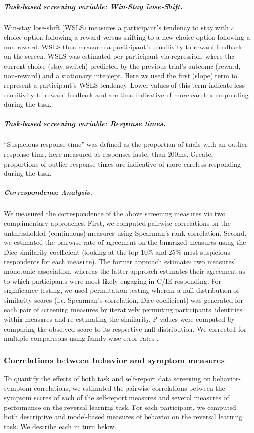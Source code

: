 \documentclass[a4paper,notitlepage,12pt]{article}
\begin{document}
\begin{refsection}[main]
\subparagraph{Task-based screening variable: Win-Stay Lose-Shift.} Win-stay lose-shift (WSLS) measures a participant's tendency to stay with a choice option following a reward versus shifting to a new choice option following a non-reward. WSLS thus measures a participant's sensitivity to reward feedback on the screen. WSLS was estimated per participant via regression, where the current choice (stay, switch) predicted by the previous trial's outcome (reward, non-reward) and a stationary intercept. Here we used the first (slope) term to represent a participant's WSLS tendency. Lower values of this term indicate less sensitivity to reward feedback and are thus indicative of more careless responding during the task.

\subparagraph{Task-based screening variable: Response times.} ``Suspicious response time'' was defined as the proportion of trials with an outlier response time, here measured as responses faster than 200ms. Greater proportions of outlier response times are indicative of more careless responding during the task.

\subparagraph{Correspondence Analysis.} We measured the correspondence of the above screening measures via two complimentary approaches. First, we computed pairwise correlations on the unthresholded (continuous) measures using Spearman's rank correlation. Second, we estimated the pairwise rate of agreement on the binarized measures using the Dice similarity coefficient (looking at the top 10\% and 25\% most suspicious respondents for each measure). The former approach estimates two measures' monotonic association, whereas the latter approach estimates their agreement as to which participants were most likely engaging in C/IE responding. For significance testing, we used permutation testing wherein a null distribution of similarity scores (i.e. Spearman's correlation, Dice coefficient) was generated for each pair of screening measures by iteratively permuting participants' identities within measures and re-estimating the similarity. P-values were computed by comparing the observed score to its respective null distribution. We corrected for multiple comparisons using family-wise error rates \cite{winkler2014permutation}.

\subsubsection{Correlations between behavior and symptom measures}

To quantify the effects of both task and self-report data screening on behavior-symptom correlations, we estimated the pairwise correlations between the symptom scores of each of the self-report measures and several measures of performance on the reversal learning task. For each participant, we computed both descriptive and model-based measures of behavior on the reversal learning task. We describe each in turn below.


\end{refsection}
\end{document}

